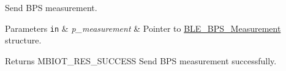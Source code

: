 Send B\+PS measurement. 


\begin{DoxyParams}[1]{Parameters}
\mbox{\tt in}  & {\em p\+\_\+measurement} & Pointer to \hyperlink{struct_b_l_e___b_p_s___measurement}{B\+L\+E\+\_\+\+B\+P\+S\+\_\+\+Measurement} structure.\\
\hline
\end{DoxyParams}
\begin{DoxyReturn}{Returns}
M\+B\+I\+O\+T\+\_\+\+R\+E\+S\+\_\+\+S\+U\+C\+C\+E\+SS Send B\+PS measurement successfully. 
\end{DoxyReturn}
